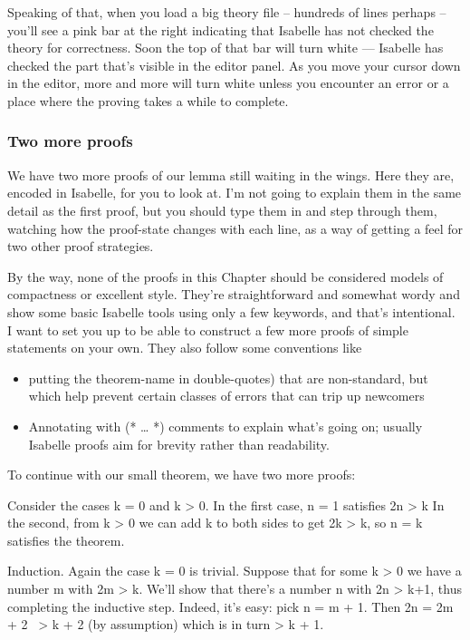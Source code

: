 Speaking of that, when you load a big theory file -- hundreds of lines perhaps -- you'll see a pink bar at the right indicating that Isabelle has not checked the theory for correctness. Soon the top of that bar will turn white --- Isabelle has checked the part that's visible in the editor panel. As you move your cursor down in the editor, more and more will turn white unless you encounter an error or a place where the proving takes a while to complete. 

\subsubsection{Two more proofs}

We have two more proofs of our lemma still waiting in the wings. Here they are, encoded in Isabelle, for you to look at. I'm not going to explain them in the same detail as the first proof, but you should type them in and step through them, watching how the proof-state changes with each line, as a way of getting a feel for two other proof strategies. 

By the way, none of the proofs in this Chapter should be considered models of compactness or excellent style. They're straightforward and somewhat wordy and show some basic Isabelle tools using only a few keywords, and that's intentional. I want to set you up to be able to construct a few more proofs of simple statements on your own. They also follow some conventions like 

\begin{itemize}
    \item putting the theorem-name in double-quotes) that are non-standard, but which help prevent certain classes of errors that can trip up newcomers
    \item Annotating with (* … *) comments to explain what's going on; usually Isabelle proofs aim for brevity rather than readability.
\end{itemize}

To continue with our small theorem, we have two more proofs: 

Consider the cases k = 0 and k > 0. In the first case, n = 1 satisfies 2n > k In the second, from k > 0 we can add k to both sides to get 2k > k, so n = k satisfies the theorem.

Induction. Again the case k = 0 is trivial. Suppose that for some k > 0 we have a number m with 2m > k. We'll show that there's a number n with 2n > k+1, thus completing the inductive step. Indeed, it's easy: pick n = m + 1. Then 2n = 2m + 2  > k + 2 (by assumption) which is in turn > k + 1. 

